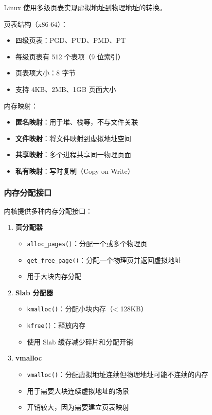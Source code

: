 Linux 使用多级页表实现虚拟地址到物理地址的转换。

页表结构（x86-64）：
\begin{itemize}
  \item 四级页表：PGD、PUD、PMD、PT
  \item 每级页表有 512 个表项（9 位索引）
  \item 页表项大小：8 字节
  \item 支持 4KB、2MB、1GB 页面大小
\end{itemize}

内存映射：
\begin{itemize}
  \item \textbf{匿名映射}：用于堆、栈等，不与文件关联
  \item \textbf{文件映射}：将文件映射到虚拟地址空间
  \item \textbf{共享映射}：多个进程共享同一物理页面
  \item \textbf{私有映射}：写时复制（Copy-on-Write）
\end{itemize}

\subsubsection{内存分配接口}

内核提供多种内存分配接口：

\begin{enumerate}
  \item \textbf{页分配器}
    \begin{itemize}
      \item \texttt{alloc\_pages()}：分配一个或多个物理页
      \item \texttt{get\_free\_page()}：分配一个物理页并返回虚拟地址
      \item 用于大块内存分配
    \end{itemize}

  \item \textbf{Slab 分配器}
    \begin{itemize}
      \item \texttt{kmalloc()}：分配小块内存（< 128KB）
      \item \texttt{kfree()}：释放内存
      \item 使用 Slab 缓存减少碎片和分配开销
    \end{itemize}

  \item \textbf{vmalloc}
    \begin{itemize}
      \item \texttt{vmalloc()}：分配虚拟地址连续但物理地址可能不连续的内存
      \item 用于需要大块连续虚拟地址的场景
      \item 开销较大，因为需要建立页表映射
    \end{itemize}
\end{enumerate}

